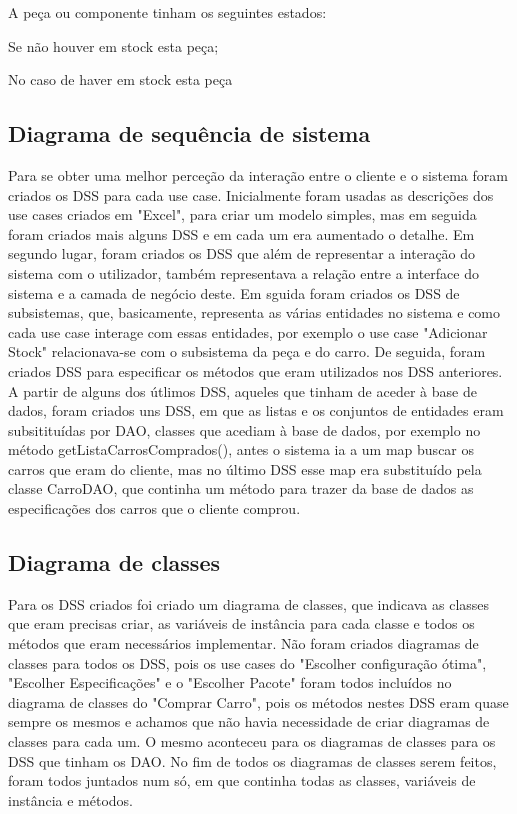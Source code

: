 \documentclass[10pt, a4paper]{article}
\begin{document}
A peça ou componente tinham os seguintes estados:
\begin{description}[align=left]
\item [Esgotado] Se não houver em stock esta peça;
\item [Disponível] No caso de haver em stock esta peça
\end{description}
\subsection{Diagrama de sequência de sistema}
Para se obter uma melhor perceção da interação entre o cliente e o sistema foram criados os DSS para cada use case. Inicialmente foram usadas as descrições dos use cases criados em "Excel", para criar um modelo simples, mas em seguida foram criados mais alguns DSS e em cada um era aumentado o detalhe. Em segundo lugar, foram criados os DSS que além de representar a interação do sistema com o utilizador, também representava a relação entre a interface do sistema e a camada de negócio deste. Em sguida foram criados os DSS de subsistemas, que, basicamente, representa as várias entidades no sistema e como cada use case interage com essas entidades, por exemplo o use case "Adicionar Stock" relacionava-se com o subsistema da peça e do carro. De seguida, foram criados DSS para especificar os métodos que eram utilizados nos DSS anteriores. A partir de alguns dos útlimos DSS, aqueles que tinham de aceder à base de dados, foram criados uns DSS, em que as listas e os conjuntos de entidades eram subsitituídas por DAO, classes que acediam à base de dados, por exemplo no método getListaCarrosComprados(), antes o sistema ia a um map buscar os carros que eram do cliente, mas no último DSS esse map era substituído pela classe CarroDAO, que continha um método para trazer da base de dados as especificações dos carros que o cliente comprou.
\subsection{Diagrama de classes}
Para os DSS criados foi criado um diagrama de classes, que indicava as classes que eram precisas criar, as variáveis de instância para cada classe e todos os métodos que eram necessários implementar. Não foram criados diagramas de classes para todos os DSS, pois os use cases do "Escolher configuração ótima", "Escolher Especificações" e o "Escolher Pacote" foram todos incluídos no diagrama de classes do "Comprar Carro", pois os métodos nestes DSS eram quase sempre os mesmos e achamos que não havia necessidade de criar diagramas de classes para cada um. O mesmo aconteceu para os diagramas de classes para os DSS que tinham os DAO.
No fim de todos os diagramas de classes serem feitos, foram todos juntados num só, em que continha todas as classes, variáveis de instância e métodos.
\end{document}
